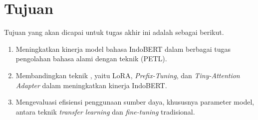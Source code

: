 \section{Tujuan}

Tujuan yang akan dicapai untuk tugas akhir ini adalah sebagai berikut.

\begin{enumerate}
    \item Meningkatkan kinerja model bahasa IndoBERT dalam berbagai tugas pengolahan bahasa alami dengan teknik \PETL (PETL).
    \item Membandingkan teknik \PETL, yaitu LoRA, \textit{Prefix-Tuning}, dan \textit{Tiny-Attention Adapter} dalam meningkatkan kinerja IndoBERT.
    \item Mengevaluasi efisiensi penggunaan sumber daya, khususnya parameter model, antara teknik \textit{transfer learning} dan \textit{fine-tuning} tradisional.
\end{enumerate}